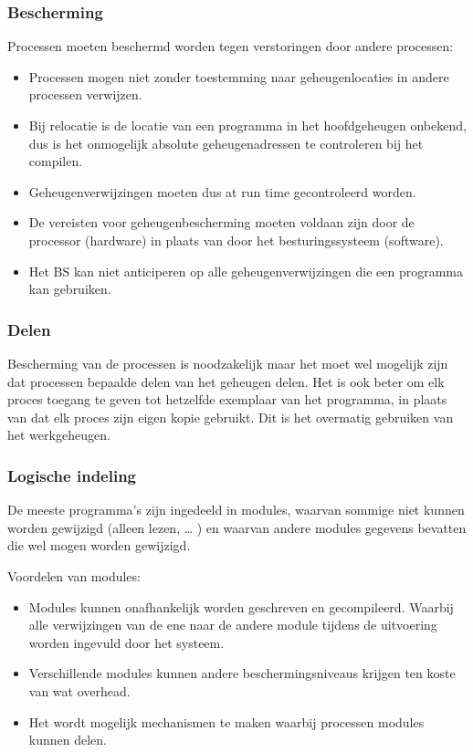 \subsubsection{Bescherming}

Processen moeten beschermd worden tegen verstoringen door andere processen:

\begin{itemize}
\item Processen mogen niet zonder toestemming naar geheugenlocaties in andere processen verwijzen.
\item Bij relocatie is de locatie van een programma in het hoofdgeheugen onbekend, dus is het onmogelijk absolute geheugenadressen te controleren bij het compilen.
\item Geheugenverwijzingen moeten dus at run time gecontroleerd worden.
\item De vereisten voor geheugenbescherming moeten voldaan zijn door de processor (hardware) in plaats van door het besturingssysteem (software).
\item Het BS kan niet anticiperen op alle geheugenverwijzingen die een programma kan gebruiken.
\end{itemize}


\subsubsection{Delen}

Bescherming van de processen is noodzakelijk maar het moet wel mogelijk zijn dat processen bepaalde delen van het geheugen delen. Het is ook beter om elk proces toegang te geven tot hetzelfde exemplaar van het programma, in plaats van dat elk proces zijn eigen kopie gebruikt. Dit is het overmatig gebruiken van het werkgeheugen.

\subsubsection{Logische indeling}

De meeste programma’s zijn ingedeeld in modules, waarvan sommige niet kunnen worden gewijzigd (alleen lezen, … ) en waarvan andere modules gegevens bevatten die wel mogen worden gewijzigd.

Voordelen van modules:


\begin{itemize}
\item Modules kunnen onafhankelijk worden geschreven en gecompileerd. Waarbij alle verwijzingen van de ene naar de andere module tijdens de uitvoering worden ingevuld door het systeem.
\item Verschillende modules kunnen andere beschermingsniveaus krijgen ten koste van wat overhead.
\item Het wordt mogelijk mechanismen te maken waarbij processen modules kunnen delen.
\end{itemize}


